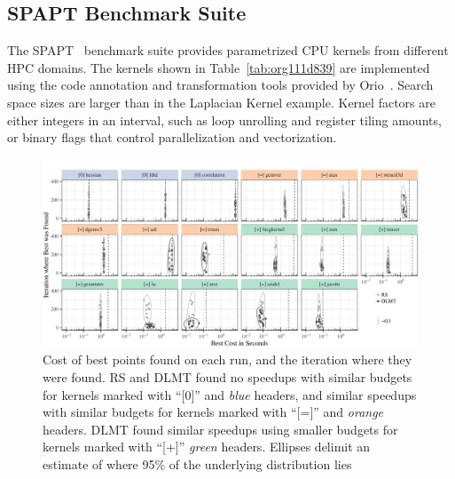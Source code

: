 \documentclass[conference]{IEEEtran}
\begin{document}
\subsection{SPAPT Benchmark Suite}
\label{sec:org976874f}
The SPAPT~\cite{balaprakash2012spapt} benchmark  suite provides parametrized CPU
kernels from  different HPC domains.  The kernels shown  in Table~\ref{tab:org111d839}
are implemented using  the code annotation and transformation  tools provided by
Orio~\cite{hartono2009annotation}.  Search space  sizes are  larger than  in the
Laplacian Kernel  example. Kernel  factors are either  integers in  an interval,
such as loop unrolling and register tiling amounts, or binary flags that control
parallelization and vectorization.

\begin{figure}[p]
\centering
\includegraphics[width=\textwidth]{./img/iteration_best_comparison.pdf}
\caption{\label{fig:org3094a0d}
Cost of best points found on each run, and the iteration where they were found. RS and DLMT found no speedups with similar budgets for kernels marked with ``[0]'' and \emph{blue} headers, and similar speedups with similar budgets for kernels marked with ``[=]'' and \emph{orange} headers. DLMT found similar speedups using smaller budgets for kernels marked with ``[+]'' \emph{green} headers. Ellipses delimit an estimate of where 95\% of the underlying distribution lies}
\end{figure}
\end{document}
